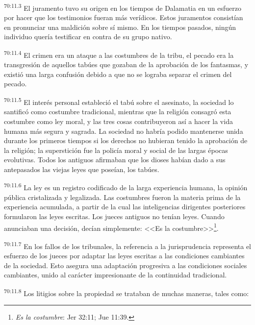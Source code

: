 \par
\textsuperscript{70:11.3} El juramento tuvo su origen en los tiempos de Dalamatia en un esfuerzo por hacer que los testimonios fueran más verídicos. Estos juramentos consistían en pronunciar una maldición sobre sí mismo. En los tiempos pasados, ningún individuo quería testificar en contra de su grupo nativo.

\par
\textsuperscript{70:11.4} El crimen era un ataque a las costumbres de la tribu, el pecado era la transgresión de aquellos tabúes que gozaban de la aprobación de los fantasmas, y existió una larga confusión debido a que no se lograba separar el crimen del pecado.

\par
\textsuperscript{70:11.5} El interés personal estableció el tabú sobre el asesinato, la sociedad lo santificó como costumbre tradicional, mientras que la religión consagró esta costumbre como ley moral, y las tres cosas contribuyeron así a hacer la vida humana más segura y sagrada. La sociedad no habría podido mantenerse unida durante los primeros tiempos si los derechos no hubieran tenido la aprobación de la religión; la superstición fue la policía moral y social de las largas épocas evolutivas. Todos los antiguos afirmaban que los dioses habían dado a sus antepasados las viejas leyes que poseían, los tabúes.

\par
\textsuperscript{70:11.6} La ley es un registro codificado de la larga experiencia humana, la opinión pública cristalizada y legalizada. Las costumbres fueron la materia prima de la experiencia acumulada, a partir de la cual las inteligencias dirigentes posteriores formularon las leyes escritas. Los jueces antiguos no tenían leyes. Cuando anunciaban una decisión, decían simplemente: <<Es la costumbre>>\footnote{\textit{Es la costumbre}: Jer 32:11; Jue 11:39.}.

\par
\textsuperscript{70:11.7} En los fallos de los tribunales, la referencia a la jurisprudencia representa el esfuerzo de los jueces por adaptar las leyes escritas a las condiciones cambiantes de la sociedad. Esto asegura una adaptación progresiva a las condiciones sociales cambiantes, unido al carácter impresionante de la continuidad tradicional.

\par
\textsuperscript{70:11.8} Los litigios sobre la propiedad se trataban de muchas maneras, tales como:

